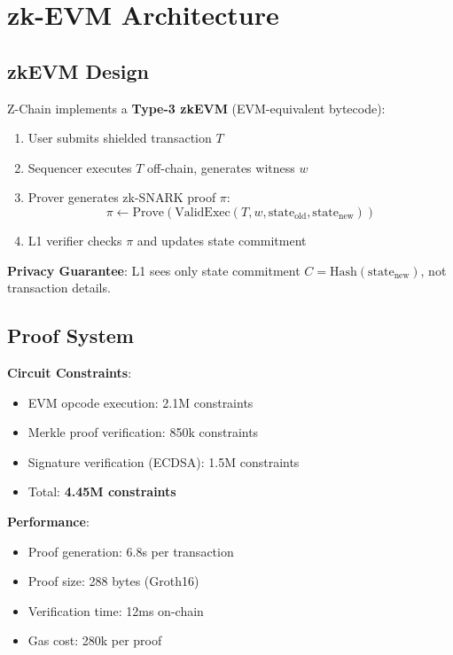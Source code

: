 \documentclass[11pt]{article}
\begin{document}
\section{zk-EVM Architecture}

\subsection{zkEVM Design}

Z-Chain implements a \textbf{Type-3 zkEVM} (EVM-equivalent bytecode):

\begin{enumerate}
  \item User submits shielded transaction $T$
  \item Sequencer executes $T$ off-chain, generates witness $w$
  \item Prover generates zk-SNARK proof $\pi$:
  \begin{equation}
    \pi \leftarrow \text{Prove}\left(\text{ValidExec}(T, w, \text{state}_{\text{old}}, \text{state}_{\text{new}})\right)
  \end{equation}
  \item L1 verifier checks $\pi$ and updates state commitment
\end{enumerate}

\textbf{Privacy Guarantee}: L1 sees only state commitment $C = \text{Hash}(\text{state}_{\text{new}})$, not transaction details.

\subsection{Proof System}

\textbf{Circuit Constraints}:
\begin{itemize}[leftmargin=1.1em]
  \item EVM opcode execution: 2.1M constraints
  \item Merkle proof verification: 850k constraints
  \item Signature verification (ECDSA): 1.5M constraints
  \item Total: \textbf{4.45M constraints}
\end{itemize}

\textbf{Performance}:
\begin{itemize}[leftmargin=1.1em]
  \item Proof generation: 6.8s per transaction
  \item Proof size: 288 bytes (Groth16)
  \item Verification time: 12ms on-chain
  \item Gas cost: 280k per proof
\end{itemize}
\end{document}
